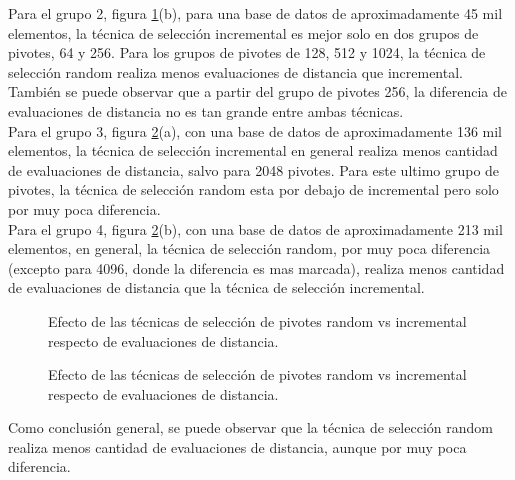 Para el grupo 2, figura \ref{fig:ETS-1}(b), para una base de datos de aproximadamente 45 mil elementos, la t\'ecnica de selecci\'on incremental es mejor solo en dos grupos de pivotes, 64 y 256. Para los grupos de pivotes de 128, 512 y 1024, la t\'ecnica de selecci\'on random realiza menos evaluaciones de distancia que incremental. Tambi\'en se puede observar que a partir del grupo de pivotes 256, la diferencia de evaluaciones de distancia no es tan grande entre ambas t\'ecnicas.\\

Para el grupo 3, figura \ref{fig:ETS-2}(a), con una base de datos de aproximadamente 136 mil elementos, la t\'ecnica de selecci\'on incremental en general realiza menos cantidad de evaluaciones de distancia, salvo para 2048 pivotes. Para este ultimo grupo de pivotes, la t\'ecnica de selecci\'on random esta por debajo de incremental pero solo por muy poca diferencia.\\

Para el grupo 4, figura \ref{fig:ETS-2}(b), con una base de datos de aproximadamente 213 mil elementos, en general, la t\'ecnica de selecci\'on random, por muy poca diferencia (excepto para 4096, donde la diferencia es mas marcada), realiza menos cantidad de evaluaciones de distancia que la t\'ecnica de selecci\'on incremental.\\


\begin{figure}[tb]
\centering
{}
\caption{\small Efecto de las t\'ecnicas de selecci\'on de pivotes random vs incremental respecto de evaluaciones de distancia.}
\label{fig:ETS-1}
\end{figure}
\begin{figure}[tb]
\centering
{}
\caption{\small Efecto de las t\'ecnicas de selecci\'on de pivotes random vs incremental respecto de evaluaciones de distancia.}
\label{fig:ETS-2}

\end{figure}

Como conclusi\'on general, se puede observar que la t\'ecnica de selecci\'on random realiza menos cantidad de evaluaciones de distancia, aunque por muy poca diferencia.\\
 
